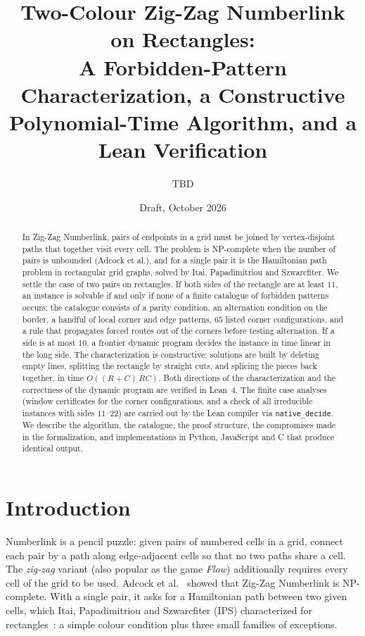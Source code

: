 \documentclass[11pt]{article}
\title{Two-Colour Zig-Zag Numberlink on Rectangles:\\
A Forbidden-Pattern Characterization, a Constructive\\
Polynomial-Time Algorithm, and a Lean Verification}
\author{TBD}
\date{Draft, October 2026}
\newcommand{\nd}{\texttt{native\_decide}\xspace}
\begin{document}
\maketitle

\begin{abstract}
In Zig-Zag Numberlink, pairs of endpoints in a grid must be joined by vertex-disjoint paths that
together visit every cell. The problem is NP-complete when the number of pairs is unbounded
(Adcock et al.), and for a single pair it is the Hamiltonian path problem in rectangular grid
graphs, solved by Itai, Papadimitriou and Szwarcfiter. We settle the case of two pairs on
rectangles. If both sides of the rectangle are at least $11$, an instance is solvable if and only
if none of a finite catalogue of forbidden patterns occurs; the catalogue consists of a parity
condition, an alternation condition on the border, a handful of local corner and edge patterns,
$65$ listed corner configurations, and a rule that propagates forced routes out of the corners
before testing alternation. If a side is at most $10$, a frontier dynamic program decides the
instance in time linear in the long side. The characterization is constructive: solutions are
built by deleting empty lines, splitting the rectangle by straight cuts, and splicing the pieces
back together, in time $O((R+C)\,RC)$. Both directions of the characterization and the
correctness of the dynamic program are verified in Lean~4. The finite case analyses (window
certificates for the corner configurations, and a check of all irreducible instances with sides
$11$--$22$) are carried out by the Lean compiler via \nd. We describe the algorithm, the
catalogue, the proof structure, the compromises made in the formalization, and implementations in
Python, JavaScript and C that produce identical output.
\end{abstract}

\section{Introduction}

Numberlink is a pencil puzzle: given pairs of numbered cells in a grid, connect each pair by a
path along edge-adjacent cells so that no two paths share a cell. The \emph{zig-zag} variant (also
popular as the game \emph{Flow}) additionally requires every cell of the grid to be used. Adcock et
al.~\cite{adcock15} showed that Zig-Zag Numberlink is NP-complete. With a single pair, it asks for a
Hamiltonian path between two given cells, which Itai, Papadimitriou and Szwarcfiter (IPS)
characterized for rectangles~\cite{ips82}: a simple colour condition plus three small families of
exceptions.
\end{document}
